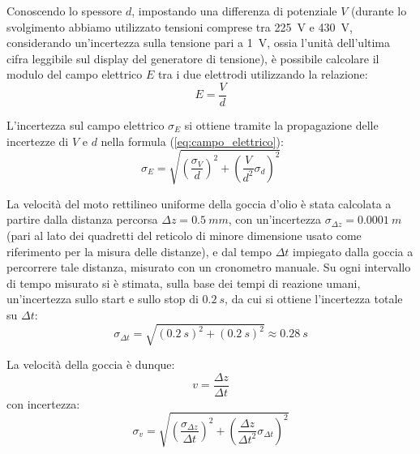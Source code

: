\documentclass[a4paper,12pt]{article}
\begin{document}
Conoscendo lo spessore \( d \), impostando una differenza di potenziale \( V \) (durante lo svolgimento abbiamo utilizzato tensioni comprese tra \SI{225}{V} e \SI{430}{V}, considerando un'incertezza sulla tensione pari a \SI{1}{V}, ossia l'unità dell'ultima cifra leggibile sul display del generatore di tensione), è possibile calcolare il modulo del campo elettrico \( E \) tra i due elettrodi utilizzando la relazione:
\begin{equation}
E= \frac{V}{d}
\label{eq:campo_elettrico}
\end{equation}

L'incertezza sul campo elettrico \( \sigma_E \) si ottiene tramite la propagazione delle incertezze di \( V \) e \( d \) nella formula (\ref{eq:campo_elettrico}):
\begin{equation}
\sigma_E= \sqrt{\left( \frac{\sigma_V}{d} \right)^2+ \left( \frac{V}{d^2} \sigma_d \right)^2}
\label{eq:incertezza_E}
\end{equation}

La velocità del moto rettilineo uniforme della goccia d’olio è stata calcolata a partire dalla distanza percorsa \( \Delta z = \SI{0.5}{mm} \), con un'incertezza \( \sigma_{\Delta z} = \SI{0.0001}{m} \) (pari al lato dei quadretti del reticolo di minore dimensione usato come riferimento per la misura delle distanze), e dal tempo \( \Delta t \) impiegato dalla goccia a percorrere tale distanza, misurato con un cronometro manuale. Su ogni intervallo di tempo misurato si è stimata, sulla base dei tempi di reazione umani, un'incertezza sullo start e sullo stop di \( \SI{0.2}{s} \), da cui si ottiene l'incertezza totale su \( \Delta t \):
\begin{equation}
\sigma_{\Delta t}= \sqrt{(\SI{0.2}{s})^2+ (\SI{0.2}{s})^2} \approx \SI{0.28}{s}
\label{eq:incertezza_tempo}
\end{equation}

La velocità della goccia è dunque:
\begin{equation}
v= \frac{\Delta z}{\Delta t}
\label{eq:velocita_goccia}
\end{equation}
con incertezza:
\begin{equation}
\sigma_v= \sqrt{\left( \frac{\sigma_{\Delta z}}{\Delta t} \right)^2+ \left( \frac{\Delta z}{\Delta t^2} \sigma_{\Delta t} \right)^2}
\label{eq:incertezza_velocita}
\end{equation}
\end{document}
